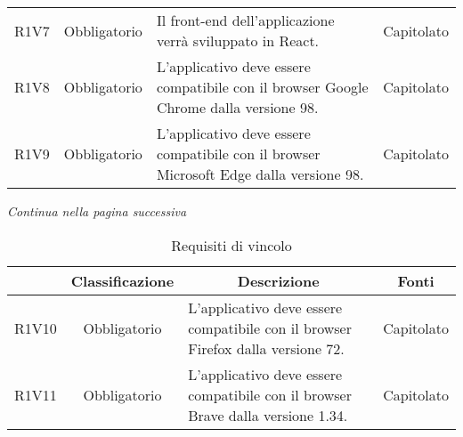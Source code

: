 \begin{table}[H]
\begin{tabular}{c | c | p{6cm} | p{4.1cm}}
        R1V7                                                              & Obbligatorio & Il front-end\glo{} dell'applicazione verrà sviluppato in React\glo{}.                                         & Capitolato               \\
        R1V8                                                              & Obbligatorio & L'applicativo deve essere compatibile con il browser Google Chrome\glo{} dalla versione 98.                   & Capitolato               \\
        R1V9                                                              & Obbligatorio & L'applicativo deve essere compatibile con il browser Microsoft Edge\glo{} dalla versione 98.                  & Capitolato               \\
    \end{tabular}
\end{table}
\begin{center}
    \textit{\small Continua nella pagina successiva}
\end{center}
\begin{table}[H]
    \centering
    \renewcommand{\arraystretch}{1.8}
    \begin{tabular}{c | c | p{6cm} | p{4.1cm}}
        \rowcolor[HTML]{125E28}
        \multicolumn{1}{c}{\color[HTML]{FFFFFF} \textbf{Codice}}            &
        \multicolumn{1}{c}{\color[HTML]{FFFFFF} \textbf{Classificazione}}   &
        \multicolumn{1}{c}{\color[HTML]{FFFFFF} \textbf{Descrizione}}       &
        \multicolumn{1}{c}{\color[HTML]{FFFFFF} \textbf{Fonti}}                                                                                                                                                                    \\
        \hline
        R1V10                                                             & Obbligatorio & L'applicativo deve essere compatibile con il browser Firefox\glo{} dalla versione 72.                         & Capitolato               \\
        R1V11                                                             & Obbligatorio & L'applicativo deve essere compatibile con il browser Brave\glo{} dalla versione 1.34.                         & Capitolato               \\
    \end{tabular}
    \caption{Requisiti di vincolo}
\end{table}

